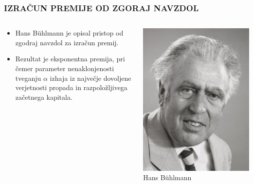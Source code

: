 \documentclass{beamer}
\begin{document}
\begin{frame}
	\frametitle{IZRAČUN PREMIJE OD ZGORAJ NAVZDOL}
	\begin{columns}[c]
		\begin{column}{0.60\textwidth}
			\begin{itemize}
				\item Hans Bühlmann je opisal pristop od zgodraj navzdol za izračun premij.
				\item Rezultat je eksponentna premija, pri čemer parameter nenaklonjenosti tveganju $\alpha$  izhaja iz največje dovoljene verjetnosti propada in razpoložljivega začetnega kapitala.
			\end{itemize}
		\end{column}
		\begin{column}{0.40\textwidth}
			\centering
			\includegraphics[scale=0.15]{hans.jpg}
			Hans Bühlmann
		\end{column}
	\end{columns}
\end{frame}
\end{document}
